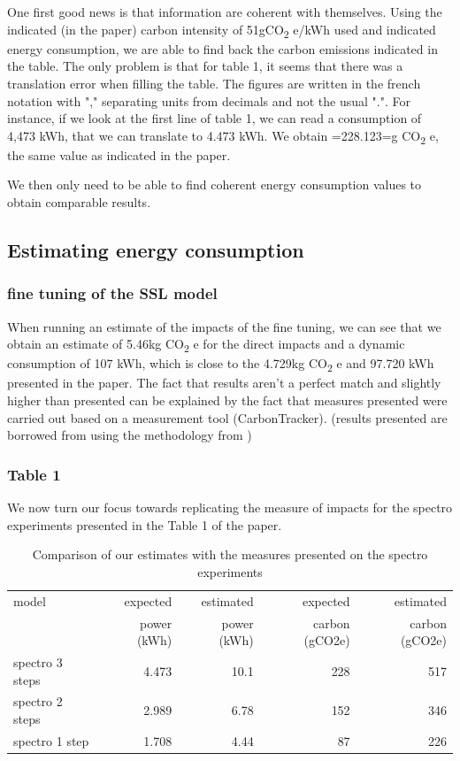 \documentclass[11pt]{article}
\begin{document}
One first good news is that information are coherent with themselves.
Using the indicated (in the paper) carbon intensity of 51gCO\textsubscript{2} e/kWh
used and indicated energy consumption, we are able to find back the carbon emissions
indicated in the table. The only problem is that for table 1, it seems
that there was a translation error when filling the table. The figures
are written in the french notation with "," separating units from
decimals and not the usual ".".
For instance, if we look at the first line of table 1, we can read
a consumption of 4,473 kWh, that we can translate to 4.473 kWh.
We obtain =228.123=g CO\textsubscript{2} e, the same value as indicated in the paper.

We then only need to be able to find coherent energy consumption
values to obtain comparable results.

\subsection{Estimating energy consumption}
\label{sec:org0d1aecf}

\subsubsection{fine tuning of the SSL model}
\label{sec:org4cb1e1c}

When running an estimate of the impacts of the fine tuning, we can see that we obtain an estimate of 5.46kg CO\textsubscript{2} e for the direct
impacts and a dynamic consumption of 107 kWh, which is close to the
4.729kg CO\textsubscript{2} e and 97.720 kWh presented in the paper. The fact that
results aren't a perfect match and slightly higher than presented can
be explained by the fact that measures presented were carried out
based on a measurement tool (CarbonTracker). (results presented are
borrowed from \cite{Evain2021task} using the methodology from \cite{parcollet2021energy})

\subsubsection{Table 1}
\label{sec:org8ba3360}
We now turn our focus towards replicating the measure of impacts for
the spectro experiments presented in the Table 1 of the paper.
\begin{table}[htbp]
\caption{Comparison of our estimates with the measures presented on the spectro experiments}
\centering
\begin{tabular}{lrrrr}
model & expected & estimated & expected & estimated\\
 & power (kWh) & power (kWh) & carbon (gCO2e) & carbon (gCO2e)\\
\hline
spectro 3 steps & 4.473 & 10.1 & 228 & 517\\
spectro 2 steps & 2.989 & 6.78 & 152 & 346\\
spectro 1 step & 1.708 & 4.44 & 87 & 226\\
\end{tabular}
\end{table}
\end{document}
